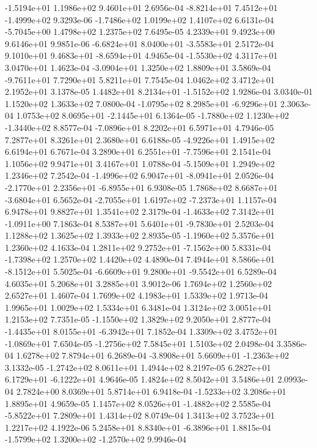 -1.5194e+01  1.1986e+02  9.4601e+01  2.6956e-04
-8.8214e+01  7.4512e+01 -1.4999e+02  9.3293e-06
-1.7486e+02  1.0199e+02  1.4107e+02  6.6131e-04
-5.7045e+00  1.4798e+02  1.2375e+02  7.6495e-05
4.2339e+01 9.4923e+00 9.6146e+01  9.9851e-06
-6.6824e+01  8.0400e+01 -3.5583e+01  2.5172e-04
 9.1010e+01  9.4683e+01 -8.6594e+01  4.9465e-04
-1.5530e+02  4.3117e+01  3.0470e+01  1.4623e-04
-3.0904e+01  1.3250e+02  1.8809e+01  3.5869e-04
-9.7611e+01  7.7290e+01  5.8211e+01  7.7545e-04
1.0462e+02 3.4712e+01 2.1952e+01  3.1378e-05
 1.4482e+01  8.2134e+01 -1.5152e+02  1.9286e-04
3.0340e-01 1.1520e+02 1.3633e+02  7.0800e-04
-1.0795e+02  8.2985e+01 -6.9296e+01  2.3063e-04
 1.0753e+02  8.0695e+01 -2.1445e+01  6.1364e-05
-1.7880e+02  1.1230e+02 -1.3440e+02  8.8577e-04
-7.0896e+01  8.2202e+01  6.5971e+01  4.7946e-05
7.2877e+01 8.3261e+01 2.3680e+01  6.6188e-05
-4.9226e+01  1.4915e+02  6.6194e+01  6.7671e-04
 3.2890e+01  6.2551e+01 -7.7596e+01  2.1541e-04
1.1056e+02 9.9471e+01 3.4167e+01  1.0788e-04
-5.1509e+01  1.2949e+02  1.2346e+02  7.2542e-04
-1.4996e+02  6.9047e+01 -8.0941e+01  2.0526e-04
-2.1770e+01  2.2356e+01 -6.8955e+01  6.9308e-05
 1.7868e+02  8.6687e+01 -3.6804e+01  6.5652e-04
-2.7055e+01  1.6197e+02 -7.2373e+01  1.1157e-04
6.9478e+01 9.8827e+01 1.3541e+02  2.3179e-04
-1.4633e+02  7.3142e+01 -1.0911e+00  7.1863e-04
 8.5387e+01  5.6401e+01 -9.7830e+01  2.5203e-04
1.1288e+02 1.3625e+02 1.3933e+02  2.8935e-05
-1.1960e+02  5.3576e+01  1.2360e+02  4.1633e-04
 1.2811e+02  9.2752e+01 -7.1562e+00  5.8331e-04
-1.7398e+02  1.2570e+02  1.4420e+02  4.4890e-04
 7.4944e+01  8.5866e+01 -8.1512e+01  5.5025e-04
-6.6609e+01  9.2800e+01 -9.5542e+01  6.5289e-04
4.6035e+01 5.2068e+01 3.2885e+01  3.9012e-06
1.7694e+02 1.2560e+02 2.6527e+01  1.4607e-04
1.7699e+02 4.1983e+01 1.5339e+02  1.9713e-04
1.9965e+01 1.0029e+02 1.5334e+01  6.3481e-04
1.3124e+02 3.0051e+01 1.2153e+02  7.7351e-05
-1.1550e+02  1.3829e+02  9.2050e+01  2.8777e-04
-1.4435e+01  8.0155e+01 -6.3942e+01  7.1852e-04
 1.3309e+02  3.4752e+01 -1.0869e+01  7.6504e-05
-1.2756e+02  7.5845e+01  1.5103e+02  2.0498e-04
3.3586e-04 1.6278e+02 7.8794e+01  6.2689e-04
-3.8908e+01  5.6609e+01 -1.2363e+02  3.1332e-05
-1.2742e+02  8.0611e+01  1.4944e+02  8.2197e-05
 6.2827e+01  6.1729e+01 -6.1222e+01  4.9646e-05
1.4824e+02 8.5042e+01 3.5486e+01  2.0993e-04
2.7824e+00 8.0369e+01 5.8714e+01  6.9418e-04
-1.5233e+02  3.2086e+01  1.8895e+01  4.9659e-05
 1.1457e+02  8.0526e+01 -1.4882e+02  2.5585e-04
-5.8522e+01  7.2809e+01  1.4314e+02  8.0749e-04
1.3413e+02 3.7523e+01 1.2217e+02  4.1922e-06
 5.2458e+01  8.8340e+01 -6.3896e+01  1.8815e-04
-1.5799e+02  1.3200e+02 -1.2570e+02  9.9946e-04
